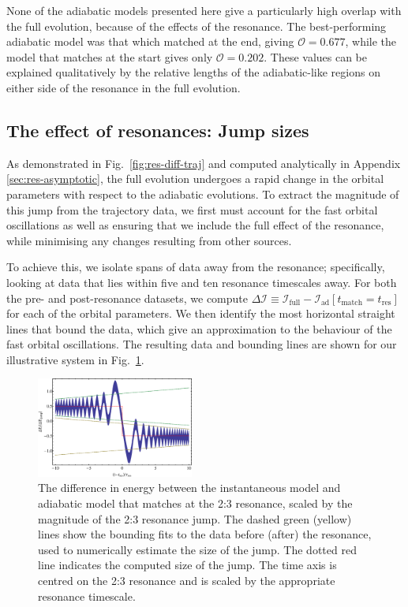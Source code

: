 \documentclass[aps,prd,amsfonts,amssymb,amsmath,nofootinbib,reprint,showpacs,superscriptaddress,twocolumn]{revtex4}
\newcommand{\figref}[1]{Fig.\ \ref{fig:#1}}
\newcommand{\apref}[1]{Appendix \ref{sec:#1}}
\begin{document}
None of the adiabatic models presented here give a particularly high overlap with the full evolution, because of the effects of the resonance. The best-performing adiabatic model was that which matched at the end, giving $\mathcal{O} = 0.677$, while the model that matches at the start gives only $\mathcal{O} = 0.202$. These values can be explained qualitatively by the relative lengths of the adiabatic-like regions on either side of the resonance in the full evolution. 

\subsection{The effect of resonances: Jump sizes}

As demonstrated in \figref{res-diff-traj} and computed analytically in \apref{res-asymptotic}, the full evolution undergoes a rapid change in the orbital parameters with respect to the adiabatic evolutions. To extract the magnitude of this jump from the trajectory data, we first must account for the fast orbital oscillations as well as ensuring that we include the full effect of the resonance, while minimising any changes resulting from other sources.

To achieve this, we isolate spans of data away from the resonance; specifically, looking at data that lies within five and ten resonance timescales away. For both the pre- and post-resonance datasets, we compute $\Delta \mathcal{I} \equiv \mathcal{I}_{\mathrm{full}} - \mathcal{I}_\mathrm{ad}[t_{\mathrm{match}} = t_\mathrm{res}]$ for each of the orbital parameters. We then identify the most horizontal straight lines that bound the data, which give an approximation to the behaviour of the fast orbital oscillations. The resulting data and bounding lines are shown for our illustrative system in \figref{res-jump-calc}.

\begin{figure}[htbp]
\centering
\includegraphics[width=0.46\textwidth]{Fig_res_jump_calc}
\caption{\label{fig:res-jump-calc}The difference in energy between the instantaneous model and adiabatic model that matches at the 2:3 resonance, scaled by the magnitude of the 2:3 resonance jump. The dashed green (yellow) lines show the bounding fits to the data before (after) the resonance, used to numerically estimate the size of the jump. The dotted red line indicates the computed size of the jump. The time axis is centred on the 2:3 resonance and is scaled by the appropriate resonance timescale.}
\end{figure}
\end{document}
